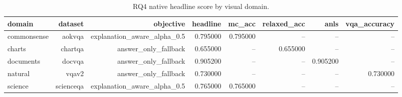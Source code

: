 \begin{table}
\caption{RQ4 native headline score by visual domain.}
\label{tab:rq4_domain}
\begin{tabular}{lrrrrrrr}
\toprule
domain & dataset & objective & headline & mc_acc & relaxed_acc & anls & vqa_accuracy \\
\midrule
commonsense & aokvqa & explanation_aware_alpha_0.5 & 0.795000 & 0.795000 & -- & -- & -- \\
charts & chartqa & answer_only_fallback & 0.655000 & -- & 0.655000 & -- & -- \\
documents & docvqa & answer_only_fallback & 0.905200 & -- & -- & 0.905200 & -- \\
natural & vqav2 & answer_only_fallback & 0.730000 & -- & -- & -- & 0.730000 \\
science & scienceqa & explanation_aware_alpha_0.5 & 0.765000 & 0.765000 & -- & -- & -- \\
\bottomrule
\end{tabular}
\end{table}
